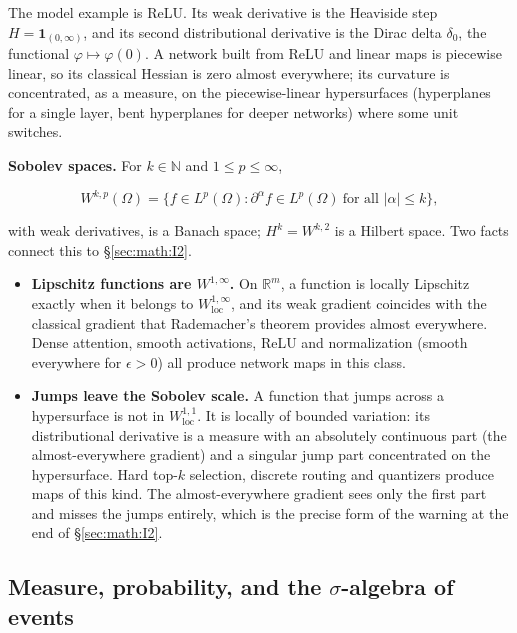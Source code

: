 The model example is ReLU. Its weak derivative is the Heaviside step \(H =
\mathbf{1}_{(0,\infty)}\), and its second distributional derivative is the Dirac delta
\(\delta_{0}\), the functional \(\varphi \mapsto \varphi(0)\). A network built from ReLU and linear
maps is piecewise linear, so its classical Hessian is zero almost
everywhere; its curvature is concentrated, as a measure, on the
piecewise-linear hypersurfaces (hyperplanes for a single layer, bent
hyperplanes for deeper networks) where some unit switches.

\textbf{Sobolev spaces.} For \(k \in \mathbb{N}\) and \(1 \le p \le \infty\),

\[
W^{k,p}(\Omega) = \{ f \in L^p(\Omega) : \partial^\alpha f \in L^p(\Omega) \ \text{for all } |\alpha| \le k \},
\]

with weak derivatives, is a Banach space; \(H^k = W^{k,2}\) is a
Hilbert space. Two facts connect this to \S\ref{sec:math:I2}.

\begin{itemize}
\tightlist
\item
  \textbf{Lipschitz functions are \(W^{1,\infty}\).} On \(\mathbb{R}^{m}\), a
  function is locally Lipschitz exactly when it belongs to
  \(W^{1,\infty}_{\mathrm{loc}}\), and its weak gradient coincides with the classical
  gradient that Rademacher's theorem provides almost everywhere. Dense
  attention, smooth activations, ReLU and normalization (smooth everywhere for \(\epsilon > 0\)) all produce network maps in this class.
\item
  \textbf{Jumps leave the Sobolev scale.} A function that jumps across a
  hypersurface is not in \(W^{1,1}_{\mathrm{loc}}\). It is locally of bounded
  variation: its distributional derivative is a measure with an
  absolutely continuous part (the almost-everywhere gradient) and a
  singular jump part concentrated on the hypersurface. Hard top-\(k\)
  selection, discrete routing and quantizers produce maps of this kind.
  The almost-everywhere gradient sees only the first part and misses the
  jumps entirely, which is the precise form of the warning at the end of
  \S\ref{sec:math:I2}.
\end{itemize}

\subsection{\texorpdfstring{Measure, probability, and the \(\sigma\)-algebra of
events}{Measure, probability, and the sigma-algebra of events}}\label{sec:math:I6}


